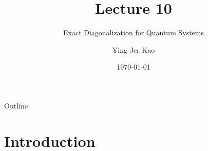 \documentclass{beamer}
\title[Exact Diagonalization for Quantum Systems] %
{Lecture 10}
\subtitle
{Exact Diagonalization for Quantum Systems } %
\author[Ying-Jer Kao] %
{Ying-Jer Kao}
\institute[National Taiwan University] %
{
  Department of Physics\\
 National Taiwan University
  }
\date[Numerical Analysis and Programming] %
{\today}
\begin{document}
\begin{frame}
  \titlepage
\end{frame}

\begin{frame}{Outline}
  \tableofcontents
\end{frame}



\section[Introduction]{Introduction}
\end{document}
